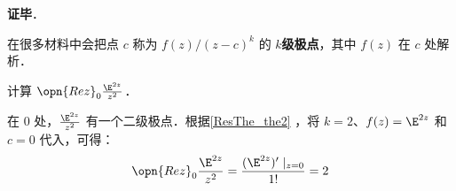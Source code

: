 \textbf{证毕}．




在很多材料中会把点 $c$ 称为 $f(z)/(z-c)^k$ 的 $k$\textbf{级极点}，其中 $f(z)$ 在 $c$ 处解析．

\begin{example}{}
计算 $\opn{Rez}_0 \frac{\E^{2z}}{z^2}$．

在 $0$ 处，$\frac{\E^{2z}}{z^2}$ 有一个二级极点．根据\autoref{ResThe_the2} ，将 $k=2$、$f(z)=\E^{2z}$ 和 $c=0$ 代入，可得：
\begin{equation}
\opn{Rez}_0\frac{\E^{2z}}{z^2}=\frac{(\E^{2z})'\mid_{z=0}}{1!}=2
\end{equation}


\end{example}












